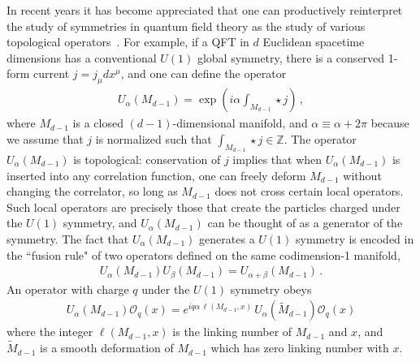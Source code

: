 \documentclass[11pt]{article}
\begin{document}
In recent years it has
become appreciated that one can productively reinterpret the study of symmetries 
in quantum field theory as the study of various topological operators~\cite{Gaiotto:2014kfa}.  For
example, if a QFT in $d$ Euclidean spacetime dimensions has a conventional $U(1)$ global
symmetry, there is a conserved 1-form current $j = j_{\mu} dx^{\mu}$, and one can define the
operator
\begin{align}
    U_{\alpha}(M_{d-1}) = \exp{\left(i \alpha \int_{M_{d-1}} \star j\right)}\, , 
    \label{eq:U1_generator}
\end{align} 
where $M_{d-1}$ is a closed $(d-1)$-dimensional manifold, and $\alpha \equiv
\alpha+2\pi$ because we assume that $j$ is normalized such that $\int_{M_{d-1}}
\star j \in \mathbb{Z}$.  The operator $U_{\alpha}(M_{d-1})$ is topological:
conservation of $j$ implies that when $U_{\alpha}(M_{d-1})$ is inserted into any
correlation function, one can freely deform $M_{d-1}$ without changing the
correlator, so long as $M_{d-1}$ does not cross certain local
operators.  Such local operators are precisely those that create the
particles charged under the $U(1)$ symmetry, and $U_{\alpha}(M_{d-1})$ can be
thought of as a generator of the symmetry. The fact that
$U_{\alpha}(M_{d-1})$ generates a $U(1)$ symmetry is encoded in the ``fusion rule" of two operators defined on the same codimension-1 manifold, 
\begin{align}
    U_{\alpha}(M_{d-1}) U_{\beta}(M_{d-1}) = U_{\alpha+\beta}(M_{d-1}) \,.
    \label{eq:U1_op_fusion}
\end{align}
An operator with charge $q$ under the
$U(1)$ symmetry obeys 
\begin{align}
    U_{\alpha}(M_{d-1}) \mathcal{O}_{q}(x) = e^{i q \alpha \,\mathcal{\ell}(M_{d-1}, x)}\, 
    U_{\alpha}(\widetilde{M}_{d-1})
    \mathcal{O}_{q}(x) 
    \label{eq:U1_op_action}
\end{align}
where the integer $\ell(M_{d-1},x)$ is the linking number of $M_{d-1}$ and $x$,
and $\widetilde{M}_{d-1}$ is a smooth deformation of $M_{d-1}$ which has zero linking number with $x$. 
\end{document}
